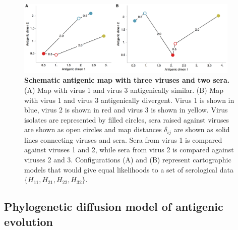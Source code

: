\documentclass[11pt,oneside,letterpaper]{article}
\begin{document}
\begin{figure}[tb]
	\centering		
	\includegraphics[width=0.95\textwidth]{figures/schematic_map}
	\caption{\textbf{Schematic antigenic map with three viruses and two sera.}
	(A) Map with virus 1 and virus 3 antigenically similar.
	(B) Map with virus 1 and virus 3 antigenically divergent.
	Virus 1 is shown in blue, virus 2 is shown in red and virus 3 is shown in yellow.
	Virus isolates are represented by filled circles, sera raised against viruses are shown as open circles and map distances $\delta_{ij}$ are shown as solid lines connecting viruses and sera.
	Sera from virus 1 is compared against viruses 1 and 2, while sera from virus 2 is compared against viruses 2 and 3.
	Configurations (A) and (B) represent cartographic models that would give equal likelihoods to a set of serological data $\{H_{11},H_{21},H_{22},H_{32}\}$.
	} 
	\label{schematic_map} 
\end{figure}

\subsection*{Phylogenetic diffusion model of antigenic evolution}
\end{document}
